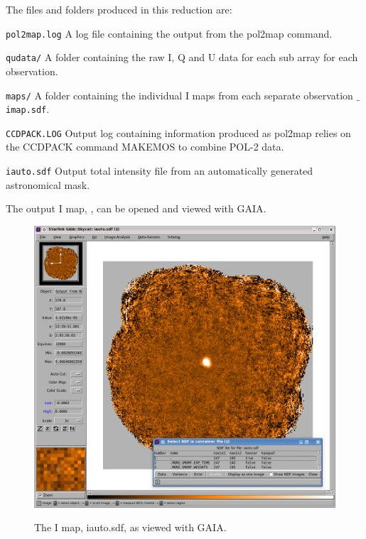 The files and folders produced in this reduction are:


\begin{aligndesc}
\item[\texttt{pol2map.log}] A log file containing the output from the
  pol2map command.

\item[\texttt{qudata/}] A folder containing the raw I, Q and U data
  for each sub array for each observation.

\item[\texttt{maps/}] A folder containing the individual I maps from
  each separate observation \texttt{$\_$imap.sdf}.

\item[\texttt{CCDPACK.LOG}] Output log containing information produced
  as pol2map relies on the CCDPACK command MAKEMOS to combine POL-2
  data.

\item[\texttt{iauto.sdf}] Output total intensity file from an
  automatically generated astronomical mask.


\end{aligndesc}

The output I map, , can be opened and viewed with GAIA.

\begin{figure}[t!]
\begin{center}
\includegraphics[width=0.8\linewidth]{sc22-gaia-view-iauto.png}
\label{fig:gaia-iauto}
\caption [I map in GAIA]{
  \small The I map, iauto.sdf, as viewed with GAIA.
}
\end{center}
\end{figure}

